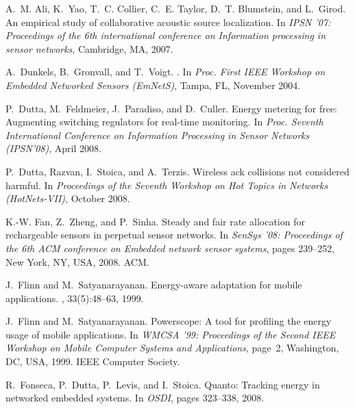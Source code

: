 \documentclass{sig-alternate}
\begin{document}
\begin{footnotesize}
\begin{thebibliography}{10}

A.~M. Ali, K.~Yao, T.~C. Collier, C.~E. Taylor, D.~T. Blumstein, and L.~Girod.
\newblock An empirical study of collaborative acoustic source localization.
\newblock In {\em IPSN '07: Proceedings of the 6th international conference on
  Information processing in sensor networks}, Cambridge, MA, 2007.

A.~Dunkels, B.~Gronvall, and T.~Voigt.
.
\newblock In {\em Proc. First IEEE Workshop on Embedded Networked Sensors
  (EmNetS)}, Tampa, FL, November 2004.

P.~Dutta, M.~Feldmeier, J.~Paradiso, and D.~Culler.
\newblock Energy metering for free: Augmenting switching regulators for
  real-time monitoring.
\newblock In {\em Proc. Seventh International Conference on Information
  Processing in Sensor Networks (IPSN'08)}, April 2008.

P.~Dutta, Razvan, I.~Stoica, and A.~Terzis.
\newblock Wireless ack collisions not considered harmful.
\newblock In {\em Proceedings of the Seventh Workshop on Hot Topics in Networks
  (HotNets-VII)}, October 2008.

K.-W. Fan, Z.~Zheng, and P.~Sinha.
\newblock Steady and fair rate allocation for rechargeable sensors in perpetual
  sensor networks.
\newblock In {\em SenSys '08: Proceedings of the 6th ACM conference on Embedded
  network sensor systems}, pages 239--252, New York, NY, USA, 2008. ACM.

J.~Flinn and M.~Satyanarayanan.
\newblock Energy-aware adaptation for mobile applications.
, 33(5):48--63, 1999.

J.~Flinn and M.~Satyanarayanan.
\newblock Powerscope: A tool for profiling the energy usage of mobile
  applications.
\newblock In {\em WMCSA '99: Proceedings of the Second IEEE Workshop on Mobile
  Computer Systems and Applications}, page~2, Washington, DC, USA, 1999. IEEE
  Computer Society.

R.~Fonseca, P.~Dutta, P.~Levis, and I.~Stoica.
\newblock Quanto: Tracking energy in networked embedded systems.
\newblock In {\em OSDI}, pages 323--338, 2008.


\end{thebibliography}
\end{footnotesize}
\end{document}
